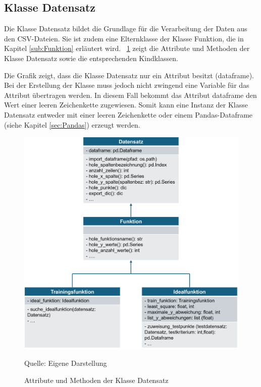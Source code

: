 \documentclass[
    a4paper, 								%
    oneside, 								%
    11pt, 									%
    listof=totoc, 					%
    bibliography=totoc, 		%
    final, 									%
    numbers=noenddot
]{scrreprt}
\newcommand{\abbildung}[1]{\figurename\ \ref{#1}}
\begin{document}
\subsection{Klasse Datensatz}
\label{sub:Datensatz}
Die Klasse Datensatz bildet die Grundlage für die Verarbeitung der Daten aus den CSV-Dateien. Sie ist zudem eine Elternklasse der Klasse Funktion, die in Kapitel \ref{sub:Funktion} erläutert wird. \abbildung{fig:Datensatz} zeigt die Attribute und Methoden der Klasse Datensatz sowie die entsprechenden Kindklassen. 

Die Grafik zeigt, dass die Klasse Datensatz nur ein Attribut besitzt (dataframe). Bei der Erstellung der Klasse muss jedoch nicht zwingend eine Variable für das Attribut übertragen werden. In diesem Fall bekommt das Attribut dataframe den Wert einer leeren Zeichenkette zugewiesen. Somit kann eine Instanz der Klasse Datensatz entweder mit einer leeren Zeichenkette oder einem Pandas-Dataframe (siehe Kapitel \ref{sec:Pandas}) erzeugt werden. 
\begin{figure}[!h]
	\centering
	\caption{Attribute und Methoden der Klasse Datensatz}
	\vspace{6pt}
	\includegraphics[scale=0.78]{Grafik_Klasse_Datensatz_Funktion}
	
	Quelle: Eigene Darstellung
	\label{fig:Datensatz}
\end{figure}
\end{document}

